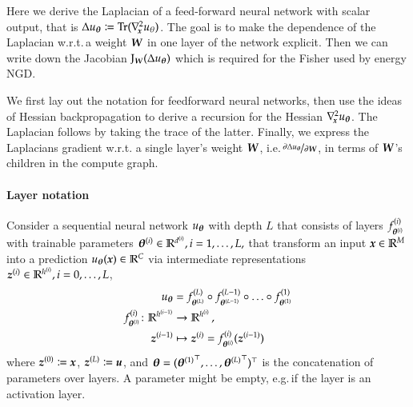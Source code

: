 Here we derive the Laplacian of a feed-forward neural network with scalar output, that is $\Delta u_{{\boldsymbol{\theta}}} \coloneqq \operatorname{Tr}(\nabla_{\!{{\boldsymbol{x}}}}^{2} u_{\theta})$.
The goal is to make the dependence of the Laplacian w.r.t.\,a weight ${\boldsymbol{W}}$ in one layer of the network explicit.
Then we can write down the Jacobian $\mathrm{J}_{{\boldsymbol{W}}}(\Delta u_{{\boldsymbol{\theta}}})$ which is required for the Fisher used by energy NGD.

We first lay out the notation for feedforward neural networks, then use the ideas of Hessian backpropagation \citep[HBP,][]{dangel2020modular} to derive a recursion for the Hessian $\nabla_{\!{{\boldsymbol{x}}}}^{2}u_{{\boldsymbol{\theta}}}$.
The Laplacian follows by taking the trace of the latter.
Finally, we express the Laplacians gradient w.r.t.
a single layer's weight ${\boldsymbol{W}}$, i.e.\,$\nicefrac{\partial \Delta u_{{\boldsymbol{\theta}}}}{\partial {\boldsymbol{W}}}$, in terms of ${\boldsymbol{W}}$'s children in the compute graph.

\paragraph{Layer notation} Consider a sequential neural network $u_{{\boldsymbol{\theta}}}$ with depth $L$ that consists of layers $f^{(i)}_{{\boldsymbol{\theta}}^{(i)}}$ with trainable parameters ${\boldsymbol{\theta}}^{(i)} \in {\mathbb{R}}^{d^{(i)}}, i=1,\dots, L,$ that transform an input ${\boldsymbol{x}} \in {\mathbb{R}}^M$ into a prediction $u_{{\boldsymbol{\theta}}}({\boldsymbol{x}})\in {\mathbb{R}}^C$ via intermediate representations ${\boldsymbol{z}}^{(i)} \in {\mathbb{R}}^{h^{(i)}}, i= 0, \dots, L$,
\begin{align}
  \begin{split}
    u_{{\boldsymbol{\theta}}}
    &=
      f^{(L)}_{{\boldsymbol{\theta}}^{(L)}} \circ f^{(L-1)}_{{\boldsymbol{\theta}}^{(L-1)}} \circ \ldots \circ f^{(1)}_{{\boldsymbol{\theta}}^{(1)}}
    \\
    f^{(i)}_{{\boldsymbol{\theta}}^{(i)}}\colon {\mathbb{R}}^{h^{(i-1)}}
    &\to
      {\mathbb{R}}^{h^{(i)}}\,,
    \\
    {\boldsymbol{z}}^{(i-1)}
    &\mapsto
      {\boldsymbol{z}}^{(i)} = f^{(i)}_{{\boldsymbol{\theta}}^{(i)}}({\boldsymbol{z}}^{(i-1)})
  \end{split}
\end{align}
where ${\boldsymbol{z}}^{(0)} \coloneqq {\boldsymbol{x}}$, ${\boldsymbol{z}}^{(L)} \coloneqq {\boldsymbol{u}}$, and ${\boldsymbol{\theta}} = ({{\boldsymbol{\theta}}^{(1)}}^{\top}, \dots, {{\boldsymbol{\theta}}^{(L)}}^{\top})^{\top}$ is the concatenation of parameters over layers.
A parameter might be empty, e.g.\,if the layer is an activation layer.



